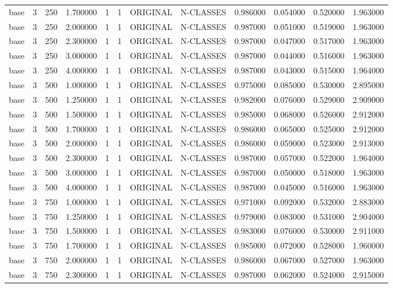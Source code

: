\begin{tabular}{lrrrllllrrrr}
base & 3 & 250 & 1.700000 & 1 & 1 & ORIGINAL & N-CLASSES & 0.986000 & 0.054000 & 0.520000 & 1.963000 \\
base & 3 & 250 & 2.000000 & 1 & 1 & ORIGINAL & N-CLASSES & 0.987000 & 0.051000 & 0.519000 & 1.963000 \\
base & 3 & 250 & 2.300000 & 1 & 1 & ORIGINAL & N-CLASSES & 0.987000 & 0.047000 & 0.517000 & 1.963000 \\
base & 3 & 250 & 3.000000 & 1 & 1 & ORIGINAL & N-CLASSES & 0.987000 & 0.044000 & 0.516000 & 1.963000 \\
base & 3 & 250 & 4.000000 & 1 & 1 & ORIGINAL & N-CLASSES & 0.987000 & 0.043000 & 0.515000 & 1.964000 \\
base & 3 & 500 & 1.000000 & 1 & 1 & ORIGINAL & N-CLASSES & 0.975000 & 0.085000 & 0.530000 & 2.895000 \\
base & 3 & 500 & 1.250000 & 1 & 1 & ORIGINAL & N-CLASSES & 0.982000 & 0.076000 & 0.529000 & 2.909000 \\
base & 3 & 500 & 1.500000 & 1 & 1 & ORIGINAL & N-CLASSES & 0.985000 & 0.068000 & 0.526000 & 2.912000 \\
base & 3 & 500 & 1.700000 & 1 & 1 & ORIGINAL & N-CLASSES & 0.986000 & 0.065000 & 0.525000 & 2.912000 \\
base & 3 & 500 & 2.000000 & 1 & 1 & ORIGINAL & N-CLASSES & 0.986000 & 0.059000 & 0.523000 & 2.913000 \\
base & 3 & 500 & 2.300000 & 1 & 1 & ORIGINAL & N-CLASSES & 0.987000 & 0.057000 & 0.522000 & 1.964000 \\
base & 3 & 500 & 3.000000 & 1 & 1 & ORIGINAL & N-CLASSES & 0.987000 & 0.050000 & 0.518000 & 1.963000 \\
base & 3 & 500 & 4.000000 & 1 & 1 & ORIGINAL & N-CLASSES & 0.987000 & 0.045000 & 0.516000 & 1.963000 \\
base & 3 & 750 & 1.000000 & 1 & 1 & ORIGINAL & N-CLASSES & 0.971000 & 0.092000 & 0.532000 & 2.883000 \\
base & 3 & 750 & 1.250000 & 1 & 1 & ORIGINAL & N-CLASSES & 0.979000 & 0.083000 & 0.531000 & 2.904000 \\
base & 3 & 750 & 1.500000 & 1 & 1 & ORIGINAL & N-CLASSES & 0.983000 & 0.076000 & 0.530000 & 2.911000 \\
base & 3 & 750 & 1.700000 & 1 & 1 & ORIGINAL & N-CLASSES & 0.985000 & 0.072000 & 0.528000 & 1.960000 \\
base & 3 & 750 & 2.000000 & 1 & 1 & ORIGINAL & N-CLASSES & 0.986000 & 0.067000 & 0.527000 & 1.963000 \\
base & 3 & 750 & 2.300000 & 1 & 1 & ORIGINAL & N-CLASSES & 0.987000 & 0.062000 & 0.524000 & 2.915000 \\

\end{tabular}
